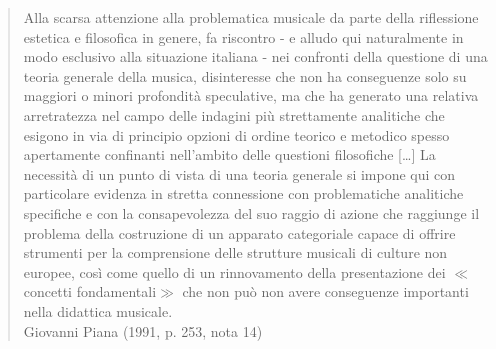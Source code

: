 \begin{quote}
	Alla scarsa attenzione alla problematica musicale da parte della riflessione estetica e filosofica in genere, fa riscontro - e alludo qui naturalmente in modo esclusivo alla situazione italiana - nei confronti della questione di una teoria generale della musica, disinteresse che non ha conseguenze solo su maggiori o minori profondità speculative, ma che ha generato una relativa arretratezza nel campo delle indagini più strettamente analitiche che esigono in via di principio opzioni di ordine teorico e metodico spesso apertamente confinanti nell'ambito delle questioni filosofiche [\ldots] La necessità di un punto di vista di una teoria generale si impone qui con particolare evidenza in stretta connessione con problematiche analitiche specifiche e con la consapevolezza del suo raggio di azione che raggiunge il problema della costruzione di un apparato categoriale capace di offrire strumenti per la comprensione delle strutture musicali di culture non europee, così come quello di un  rinnovamento della presentazione dei $\ll$concetti fondamentali$\gg$ che non può non avere conseguenze importanti nella didattica musicale. \\ Giovanni Piana (1991, p. 253, nota 14)
\end{quote}



